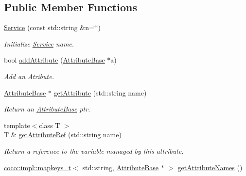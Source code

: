 \subsection*{Public Member Functions}
\begin{DoxyCompactItemize}
\item 
\hypertarget{classcoco_1_1_service_afcdc2a94142f87cf2e86da7fc7973011}{}\hyperlink{classcoco_1_1_service_afcdc2a94142f87cf2e86da7fc7973011}{Service} (const std\+::string \&n=\char`\"{}\char`\"{})\label{classcoco_1_1_service_afcdc2a94142f87cf2e86da7fc7973011}

\begin{DoxyCompactList}\small\item\em Initialize \hyperlink{classcoco_1_1_service}{Service} name. \end{DoxyCompactList}\item 
\hypertarget{classcoco_1_1_service_abba97c5449141cf2b80caa818b815b0b}{}bool \hyperlink{classcoco_1_1_service_abba97c5449141cf2b80caa818b815b0b}{add\+Attribute} (\hyperlink{classcoco_1_1_attribute_base}{Attribute\+Base} $\ast$a)\label{classcoco_1_1_service_abba97c5449141cf2b80caa818b815b0b}

\begin{DoxyCompactList}\small\item\em Add an Atribute. \end{DoxyCompactList}\item 
\hypertarget{classcoco_1_1_service_a69fa3e93fbe6942d48e2736d401e3d8c}{}\hyperlink{classcoco_1_1_attribute_base}{Attribute\+Base} $\ast$ \hyperlink{classcoco_1_1_service_a69fa3e93fbe6942d48e2736d401e3d8c}{get\+Attribute} (std\+::string name)\label{classcoco_1_1_service_a69fa3e93fbe6942d48e2736d401e3d8c}

\begin{DoxyCompactList}\small\item\em Return an \hyperlink{classcoco_1_1_attribute_base}{Attribute\+Base} ptr. \end{DoxyCompactList}\item 
\hypertarget{classcoco_1_1_service_a5a557418f6e2b7767d8a9f39d80f8a97}{}{\footnotesize template$<$class T $>$ }\\T \& \hyperlink{classcoco_1_1_service_a5a557418f6e2b7767d8a9f39d80f8a97}{get\+Attribute\+Ref} (std\+::string name)\label{classcoco_1_1_service_a5a557418f6e2b7767d8a9f39d80f8a97}

\begin{DoxyCompactList}\small\item\em Return a reference to the variable managed by this attribute. \end{DoxyCompactList}\item 
\hypertarget{classcoco_1_1_service_a8dbccd58d7a3cc3f0a8de2bfc22c76ed}{}\hyperlink{structcoco_1_1impl_1_1mapkeys__t}{coco\+::impl\+::mapkeys\+\_\+t}$<$ std\+::string, \hyperlink{classcoco_1_1_attribute_base}{Attribute\+Base} $\ast$ $>$ \hyperlink{classcoco_1_1_service_a8dbccd58d7a3cc3f0a8de2bfc22c76ed}{get\+Attribute\+Names} ()\label{classcoco_1_1_service_a8dbccd58d7a3cc3f0a8de2bfc22c76ed}


\end{DoxyCompactItemize}
